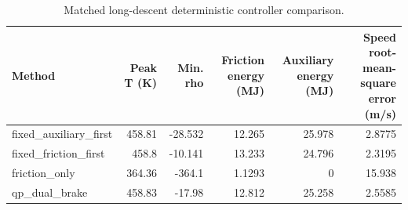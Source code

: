 \begin{table}[!t]
\centering
\scriptsize
\caption{Matched long-descent deterministic controller comparison.}
\label{tab:phase2m-controller}
\begin{tabular}{lrrrrr}
\hline
Method & Peak T (K) & Min. rho & Friction energy (MJ) & Auxiliary energy (MJ) & Speed root-mean-square error (m/s) \\
\hline
fixed\_auxiliary\_first & 458.81 & -28.532 & 12.265 & 25.978 & 2.8775 \\
fixed\_friction\_first & 458.8 & -10.141 & 13.233 & 24.796 & 2.3195 \\
friction\_only & 364.36 & -364.1 & 1.1293 & 0 & 15.938 \\
qp\_dual\_brake & 458.83 & -17.98 & 12.812 & 25.258 & 2.5585 \\
\hline
\end{tabular}
\end{table}
